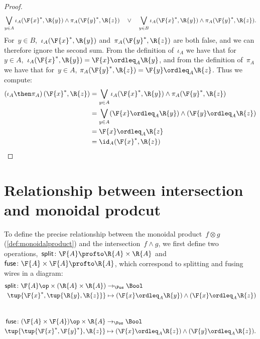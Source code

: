 \begin{proof}
  \begin{equation}
    \bigvee_{y \in A} \iota_A(\F{x}^*,\R{y}) \wedge \pi_A(\F{y}^*,\R{z}) \quad\vee\quad
    \bigvee_{y \in B} \iota_A(\F{x}^*,\R{y}) \wedge \pi_A(\F{y}^*,\R{z}).
  \end{equation}
  For~$y \in B$,~$\iota_A(\F{x}^*,\R{y})$ and~$\pi_A(\F{y}^*,\R{z})$ are both false, and we can therefore ignore the second sum.
  From the definition of~$\iota_A$ we have that for~$y\in A$,~$ \iota_A(\F{x}^*,\R{y})=\F{x} \ordleq_A \R{y}$, and from the definition of~$\pi_A$ we have that for~$y\in A$, $\pi_A(\F{y}^*,\R{z})=\F{y} \ordleq_A \R{z}$. Thus we compute:
  \begin{equation}
    \begin{aligned}
      \left(\iota_A\then \pi_A\right)(\F{x}^*, \R{z}) &= \bigvee_{y \in A} \iota_A(\F{x}^*,\R{y}) \wedge \pi_A(\F{y}^*,\R{z})  \\
      &= \bigvee_{y \in A} (\F{x} \ordleq_A \R{y}) \wedge  (\F{y} \ordleq_A \R{z}) \\
      &= \F{x} \ordleq_A \R{z}\\
      &= \id_A(\F{x}^*, \R{z})
    \end{aligned}
  \end{equation}
\end{proof}

\section{Relationship between intersection and monoidal prodcut}
To define the precise relationship between the monoidal product~$f \otimes g$ (\cref{def:monoidalproduct}) and the intersection~$f \wedge g$, we first define two operations,~$\mathsf{split} \colon \F{A} \profto \R{A} \times \R{A}$ and~$\mathsf{fuse} \colon \F{A} \times \F{A} \profto \R{A}$, which correspond to splitting and fusing wires in a diagram:
\begin{equation}
  \begin{aligned}
    \mathsf{split} \colon \F{A}\op \times (\R{A} \times \R{A}) &\to_\Pos \Bool \\
    \tup{\F{x}^*, \tup{\R{y}, \R{z}}} &\mapsto (\F{x} \ordleq_A \R{y}) \wedge (\F{x} \ordleq_A \R{z})
  \end{aligned}
\end{equation}
~
\begin{equation}
  \begin{aligned}
    \mathsf{fuse} \colon (\F{A} \times \F{A})\op \times \R{A} &\to_\Pos \Bool \\
    \tup{ \tup{\F{x}^*, \F{y}^*}, \R{z}} &\mapsto (\F{x} \ordleq_A \R{z}) \wedge (\F{y} \ordleq_A \R{z}).
  \end{aligned}
\end{equation}

